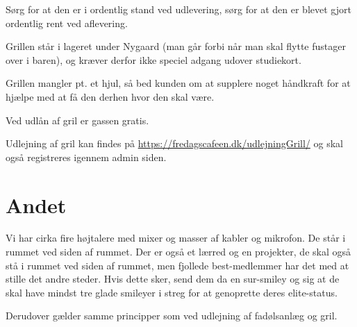 Sørg for at den er i ordentlig stand ved udlevering, sørg for at den er blevet gjort ordentlig rent ved aflevering.

Grillen står i lageret under Nygaard (man går forbi når man skal flytte fustager over i baren), og kræver derfor ikke speciel adgang udover studiekort.

Grillen mangler pt. et hjul, så bed kunden om at supplere noget håndkraft for at hjælpe med at få den derhen hvor den skal være.

Ved udlån af gril er gassen gratis.

Udlejning af gril kan findes på \url{https://fredagscafeen.dk/udlejningGrill/} og skal også registreres igennem admin siden.

\section{Andet}
Vi har cirka fire højtalere med mixer og masser af kabler og mikrofon. De står i rummet ved siden af rummet. Der er også et lærred og en projekter, de skal også stå i rummet ved siden af rummet, men fjollede best-medlemmer har det med at stille det andre steder. Hvis dette sker, send dem da en sur-smiley og sig at de skal have mindst tre glade smileyer i streg for at genoprette deres elite-status.

Derudover gælder samme principper som ved udlejning af fadølsanlæg og gril.



